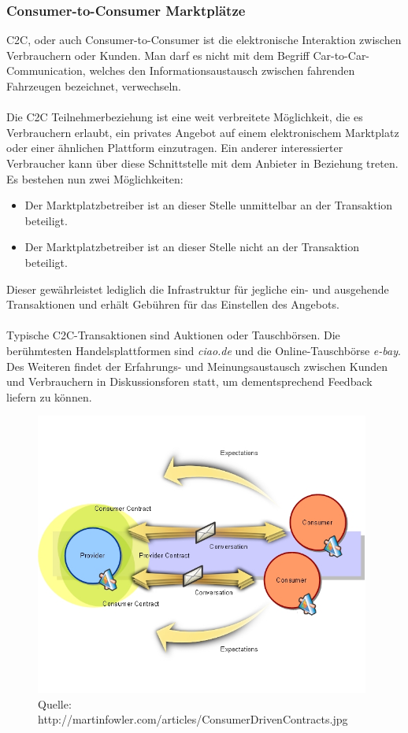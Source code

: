 \documentclass[11pt,a4paper]{article}
\begin{document}
\subsubsection{Consumer-to-Consumer Marktplätze}

C2C, oder auch Consumer-to-Consumer ist die elektronische Interaktion zwischen Verbrauchern oder Kunden. Man darf es nicht mit dem Begriff Car-to-Car-Communication, welches den Informationsaustausch zwischen fahrenden Fahrzeugen bezeichnet, verwechseln. \\ \\

\noindent Die C2C Teilnehmerbeziehung ist eine weit verbreitete Möglichkeit, die es Verbrauchern erlaubt, ein privates Angebot auf einem elektronischem Marktplatz oder einer ähnlichen Plattform einzutragen. Ein anderer interessierter Verbraucher kann über diese Schnittstelle mit dem Anbieter in Beziehung treten. Es bestehen nun zwei Möglichkeiten: 
\begin{itemize}
	\item Der Marktplatzbetreiber ist an dieser Stelle unmittelbar an der Transaktion beteiligt.
	\item Der Marktplatzbetreiber ist an dieser Stelle nicht an der Transaktion beteiligt.
\end{itemize}

\noindent Dieser gewährleistet lediglich die Infrastruktur für jegliche ein- und ausgehende Transaktionen und erhält Gebühren für das Einstellen des Angebots. \\\\
\noindent Typische C2C-Transaktionen sind Auktionen oder Tauschbörsen. Die berühmtesten Handelsplattformen sind \textit{ciao.de} und die Online-Tauschbörse \textit{e-bay}. Des Weiteren findet der Erfahrungs- und Meinungsaustausch zwischen Kunden und Verbrauchern in Diskussionsforen statt, um dementsprechend Feedback liefern zu können.

\begin{figure}[ht!]
	\centering
	\includegraphics[width=110mm]{consumercc}
	\caption{Quelle: http://martinfowler.com/articles/ConsumerDrivenContracts.jpg \label{consumercc}}
\end{figure}
\end{document}
